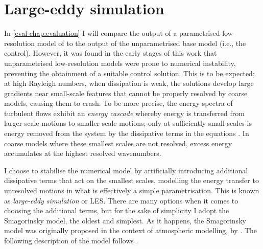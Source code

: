 \documentclass[../main.tex]{subfiles}
\begin{document}
\section{Large-eddy simulation} \label{sec:les}
In \cref{eval-chap:evaluation} I will compare the output of a parametrised
low-resolution model of  to the
output of the unparametrised base model (i.e., the control). However, it was
found in the early stages of this work that unparametrised low-resolution
models were prone to numerical instability, preventing the obtainment of a
suitable control solution. This is to be expected; at high Rayleigh numbers,
when dissipation is weak, the solutions develop large gradients near
small-scale features that cannot be properly resolved by coarse models, causing
them to crash. To be more precise, the energy spectra of turbulent flows
exhibit an \emph{energy cascade} whereby energy is transferred from
larger-scale motions to smaller-scale motions; only at sufficiently small
scales is energy removed from the system by the dissipative terms in the
equations \parencite{pope2000}. In coarse models where these smallest scales
are not resolved, excess energy accumulates at the highest resolved
wavenumbers.

I choose to stabilise the numerical model by artificially introducing
additional dissipative terms that act on the smallest scales, modelling the
energy transfer to unresolved motions in what is effectively a simple
parametrisation. This is known as \emph{large-eddy simulation} or LES. There
are many options when it comes to choosing the additional terms, but for the
sake of simplicity I adopt the Smagorinsky model, the oldest and simplest. As
it happens, the Smagorinsky model was originally proposed in the context of
atmospheric modelling, by \textcite{smagorinsky1963}. The following description
of the model follows \textcite{pope2000}.
\end{document}
